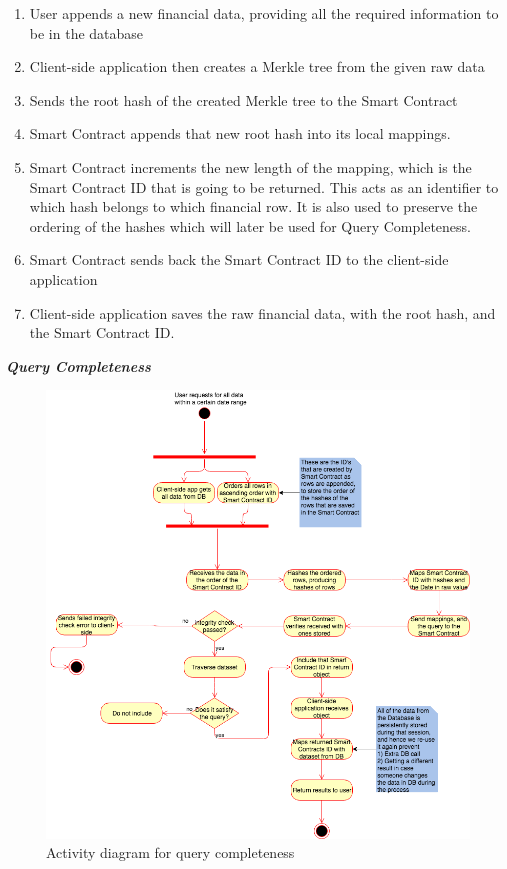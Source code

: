 \begin{enumerate}
\item User appends a new financial data, providing all the required information to be in the database
\item Client-side application then creates a Merkle tree from the given raw data
\item Sends the root hash of the created Merkle tree to the Smart Contract
\item Smart Contract appends that new root hash into its local mappings.
\item Smart Contract increments the new length of the mapping, which is the Smart Contract ID that is going to be returned. This acts as an identifier to which hash belongs to which financial row. It is also used to preserve the ordering of the hashes which will later be used for Query Completeness.
\item Smart Contract sends back the Smart Contract ID to the client-side application
\item Client-side application saves the raw financial data, with the root hash, and the Smart Contract ID.
\end{enumerate}

\textbf{\textit{Query Completeness}}

\begin{figure}[h]%
\centering
\includegraphics[width=1.0\textwidth]{images/queryCompleteness.png}
\caption{\label{fig:queryCompleteness}Activity diagram for query completeness}
\end{figure}


